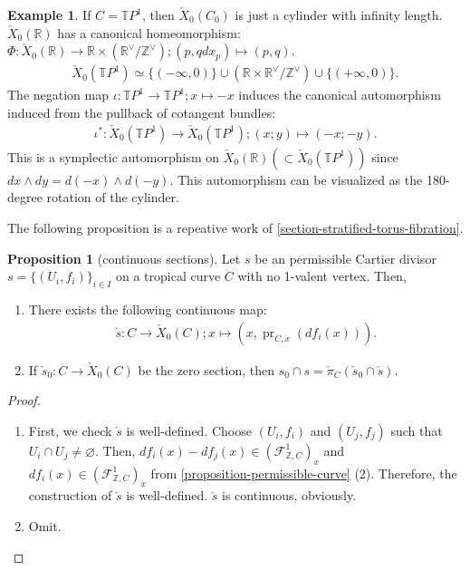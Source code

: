 \documentclass[a4paper,dvipdfmx,reqno,12pt]{amsart}
\theoremstyle{definition}
\newtheorem{example}[theorem]{Example}
\newtheorem{proposition}[theorem]{Proposition}
\newcommand{\emp}{\varnothing}%
\newcommand{\opn}[1]{\operatorname{#1}}
\numberwithin{equation}{section}
\begin{document}
\begin{example}
If $C=\mathbb{T}P^{1}$, then 
$\check{X}_0(C_0)$ is just a 
cylinder with infinity length.
$\check{X}_0(\mathbb{R})$ has a canonical homeomorphism:
$\Phi \colon \check{X}_0(\mathbb{R})\to 
\mathbb{R}\times (\mathbb{R}^{\vee}/\mathbb{Z}^{\vee});
(p,q dx_p)\mapsto (p,q)$.
\begin{align}
\check{X}_0(\mathbb{T}P^{1})\simeq 
\{(-\infty,0)\}\cup(\mathbb{R}\times 
\mathbb{R}^{\vee}/\mathbb{Z}^{\vee})
\cup \{(+\infty,0)\}.
\end{align}
The negation map
$\iota \colon\mathbb{T}P^{1}\to \mathbb{T}P^{1}; x\mapsto -x$
induces the canonical automorphism induced from the pullback of cotangent bundles:
\begin{align}
\iota^{*}\colon \check{X}_0(\mathbb{T}P^{1})
\to \check{X}_0(\mathbb{T}P^{1}); (x;y)\mapsto (-x;-y). 
\end{align}
This is a symplectic automorphism on 
$\check{X}_0(\mathbb{R}) (\subset \check{X}_0(\mathbb{T}P^{1}))$ since 
$dx\wedge dy=d(-x)\wedge d(-y)$.
This automorphism can be visualized as the 180-degree rotation of the 
cylinder.
\end{example}

The following proposition is a repeative work of
\cref{section-stratified-torus-fibration}.

\begin{proposition}[{continuous sections}]
\label{proposition-permissible-section}
Let $s$ be an permissible Cartier divisor 
$s=\{(U_i,f_i)\}_{i\in I}$ on a tropical curve 
$C$ with no 1-valent vertex. 
Then, 
\begin{enumerate}
\item There exists the following continuous map:
\begin{align}
\check{s}\colon C\to \check{X}_0 (C); x
\mapsto (x,\opn{pr}_{C,x}(df_{i}(x))).
\end{align}
\item If $\check{s}_0\colon C\to \check{X}_0 (C)$ be the 
zero section, then $s_0\cap s=\check{\pi}_C(\check{s}_0\cap \check{s})$.
\end{enumerate}
\end{proposition}
\begin{proof}
\begin{enumerate}
\item First, we check $\check{s}$ is well-defined.
Choose $(U_i,f_i)$ and $(U_j,f_j)$ such that
$U_i\cap U_j\neq \emp$. 
Then, $df_i(x)-df_j(x)\in 
(\mathcal{F}_{\mathbb{Z},C}^{1})_x$ and
$df_i(x)\in (\mathcal{F}_{\mathbb{Z},C}^{1})_x$
from \cref{proposition-permissible-curve} (2).
Therefore, the construction of $\check{s}$ is well-defined.
$\check{s}$ is continuous, obviously.
\item Omit.
\end{enumerate}
\end{proof}
\end{document}
